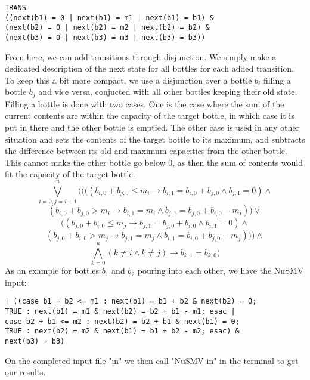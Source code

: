 \begin{verbatim}
TRANS
((next(b1) = 0 | next(b1) = m1 | next(b1) = b1) &
(next(b2) = 0 | next(b2) = m2 | next(b2) = b2) &
(next(b3) = 0 | next(b3) = m3 | next(b3) = b3))
\end{verbatim}
From here, we can add transitions through disjunction. We simply make a dedicated description of the next state for all bottles for each added transition. To keep this a bit more compact, we use a disjunction over a bottle $b_i$ filling a bottle $b_j$ and vice versa, conjucted with all other bottles keeping their old state. Filling a bottle is done with two cases. One is the case where the sum of the current contents are within the capacity of the target bottle, in which case it is put in there and the other bottle is emptied. The other case is used in any other situation and sets the contents of the target bottle to its maximum, and subtracts the difference between its old and maximum capacities from the other bottle. This cannot make the other bottle go below $0$, as then the sum of contents would fit the capacity of the target bottle.
\[ \bigvee_{i=0,j=i+1}^n ((((b_{i,0} + b_{j,0} \leq m_i \rightarrow b_{i,1} = b_{i,0} + b_{j,0} \land b_{j,1} = 0) \land \]
\[ (b_{i,0} + b_{j,0} > m_i \rightarrow b_{i,1} = m_i \land b_{j,1} = b_{j,0} + b_{i,0} - m_i)) \lor  \]
\[((b_{j,0} + b_{i,0} \leq m_j \rightarrow b_{j,1} = b_{j,0} + b_{i,0} \land b_{i,1} = 0) \land \]
\[ (b_{j,0} + b_{i,0} > m_j \rightarrow b_{j,1} = m_j \land b_{i,1} = b_{i,0} + b_{j,0} - m_j))) \land  \]
\[ \bigwedge_{k=0}^n (k \neq i \land k \neq j) \rightarrow  b_{k,1} = b_{k,0} )\]
As an example for bottles $b_1$ and $b_2$ pouring into each other, we have the NuSMV input:\\
\begin{verbatim}
| ((case b1 + b2 <= m1 : next(b1) = b1 + b2 & next(b2) = 0; 
TRUE : next(b1) = m1 & next(b2) = b2 + b1 - m1; esac |
case b2 + b1 <= m2 : next(b2) = b2 + b1 & next(b1) = 0; 
TRUE : next(b2) = m2 & next(b1) = b1 + b2 - m2; esac) & 
next(b3) = b3)
\end{verbatim}
On the completed input file "in" we then call "NuSMV in" in the terminal to get our results.

